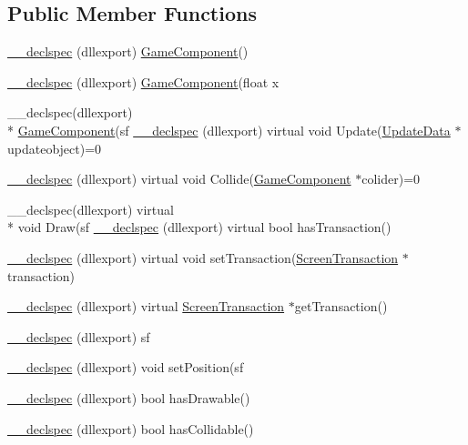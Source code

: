 \subsection*{Public Member Functions}
\begin{DoxyCompactItemize}
\item 
\hyperlink{class_game_component_aec6902a27ee66f4b1412c102277be8f9}{\-\_\-\-\_\-declspec} (dllexport) \hyperlink{class_game_component}{Game\-Component}()
\item 
\hyperlink{class_game_component_a2249fc751888d23760697125a6964188}{\-\_\-\-\_\-declspec} (dllexport) \hyperlink{class_game_component}{Game\-Component}(float x
\item 
\-\_\-\-\_\-declspec(dllexport) \\*
\hyperlink{class_game_component}{Game\-Component}(sf \hyperlink{class_game_component_af96aa26b5c66f4964b389013eaea8e35}{\-\_\-\-\_\-declspec} (dllexport) virtual void Update(\hyperlink{class_update_data}{Update\-Data} $\ast$updateobject)=0
\item 
\hyperlink{class_game_component_a0b877f1873af198a8e62e9ac06d5a02f}{\-\_\-\-\_\-declspec} (dllexport) virtual void Collide(\hyperlink{class_game_component}{Game\-Component} $\ast$colider)=0
\item 
\-\_\-\-\_\-declspec(dllexport) virtual \\*
void Draw(sf \hyperlink{class_game_component_afc9c014f6823348b7b3c14a2d094def6}{\-\_\-\-\_\-declspec} (dllexport) virtual bool has\-Transaction()
\item 
\hyperlink{class_game_component_a463a4133dc8265091be605987964f459}{\-\_\-\-\_\-declspec} (dllexport) virtual void set\-Transaction(\hyperlink{class_screen_transaction}{Screen\-Transaction} $\ast$transaction)
\item 
\hyperlink{class_game_component_a5b242ec0a5849c9d017cdeb505cb81aa}{\-\_\-\-\_\-declspec} (dllexport) virtual \hyperlink{class_screen_transaction}{Screen\-Transaction} $\ast$get\-Transaction()
\item 
\hyperlink{class_game_component_a72a2a194cda8b2dbd409529b860c9b77}{\-\_\-\-\_\-declspec} (dllexport) sf
\item 
\hyperlink{class_game_component_abe485cab452953b6c1f0acba5a818cf6}{\-\_\-\-\_\-declspec} (dllexport) void set\-Position(sf
\item 
\hyperlink{class_game_component_a2cfb54512fe7510015f8088f7f65695e}{\-\_\-\-\_\-declspec} (dllexport) bool has\-Drawable()
\item 
\hyperlink{class_game_component_a88fa0ae59963cfe37ef8c701070fb6f3}{\-\_\-\-\_\-declspec} (dllexport) bool has\-Collidable()

\end{DoxyCompactItemize}
